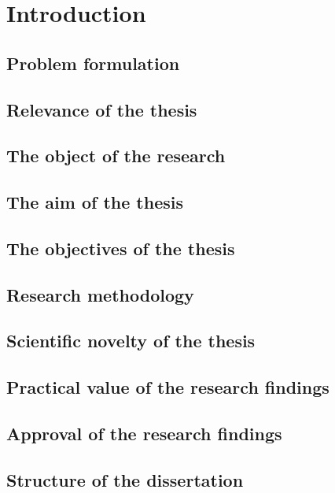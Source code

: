 \chapter{Introduction}
\label{ChapterIntroduction}

\section{Problem formulation}

\lipsum[1]

\section{Relevance of the thesis}

\lipsum[1]

\section{The object of the research}

\lipsum[1]

\section{The aim of the thesis}

\lipsum[1]

\section{The objectives of the thesis}

\lipsum[1]

\section{Research methodology}

\lipsum[1]

\section{Scientific novelty of the thesis}

\lipsum[1]

\section{Practical value of the research findings}

\lipsum[1]

\section{Approval of the research findings}

\lipsum[1]

\section{Structure of the dissertation}

\lipsum[1]

\FloatBlock